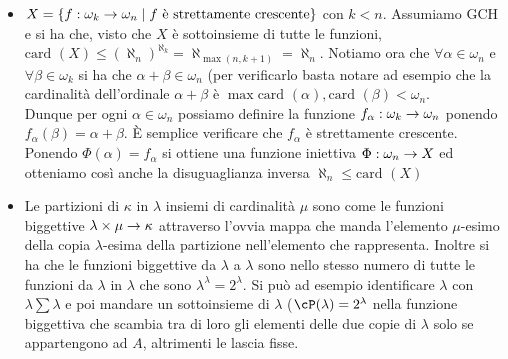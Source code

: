 \documentclass[a4paper,NoNotes,GeneralMath]{stdmdoc}
\newcommand{\card}[1]{\text{card }({#1})}
\begin{document}
\begin{itemize}
		\item $X = \{ f: \omega_k \rightarrow \omega_n \mid f \text{ è strettamente crescente} \}$ con $k < n$. Assumiamo GCH e si ha che, visto che $X$ è sottoinsieme di tutte le funzioni, $\card{X} \le (\aleph_n)^{\aleph_k} = \aleph_{\max(n, k + 1)} = \aleph_n$. Notiamo ora che $\forall \alpha \in \omega_n$ e $\forall \beta \in \omega_k$ si ha che $\alpha + \beta \in \omega_n$ (per verificarlo basta notare ad esempio che la cardinalità dell'ordinale $\alpha + \beta$ è $\max{\card{\alpha}, \card{\beta}} < \omega_n$. \\
			Dunque per ogni $\alpha \in \omega_n$ possiamo definire la funzione $f_\alpha: \omega_k \rightarrow \omega_n$ ponendo $f_\alpha (\beta) = \alpha + \beta$. È semplice verificare che $f_\alpha$ è strettamente crescente. Ponendo $\Phi(\alpha) = f_\alpha$ si ottiene una funzione iniettiva $\Phi: \omega_n \rightarrow X$ ed otteniamo così anche la disuguaglianza inversa $\aleph_n \le \card{X}$
		\item Le partizioni di $\kappa$ in $\lambda$ insiemi di cardinalità $\mu$ sono come le funzioni biggettive $\lambda \times \mu \rightarrow \kappa$ attraverso l'ovvia mappa che manda l'elemento $\mu$-esimo della copia $\lambda$-esima della partizione nell'elemento che rappresenta. Inoltre si ha che le funzioni biggettive da $\lambda$ a $\lambda$ sono nello stesso numero di tutte le funzioni da $\lambda$ in $\lambda$ che sono $\lambda^\lambda = 2^\lambda$. Si può ad esempio identificare $\lambda$ con $\lambda \sum \lambda$ e poi mandare un sottoinsieme di $\lambda$ ($\cP(\lambda) = 2^\lambda$ nella funzione biggettiva che scambia tra di loro gli elementi delle due copie di $\lambda$ solo se appartengono ad $A$, altrimenti le lascia fisse.
	\end{itemize}
	
\end{document}
